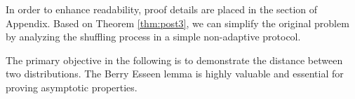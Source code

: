\documentclass[letterpaper]{article} %
\newtheorem{lemma}{Lemma}
\begin{document}
In order to enhance readability, proof details are placed in the section of Appendix. Based on Theorem \ref{thm:post3}, we can simplify the original problem by analyzing the shuffling process in a simple non-adaptive protocol.

The primary objective in the following is to demonstrate the distance between two distributions. The Berry Esseen lemma \cite{berry1941accuracy,Esseen1942} is highly valuable and essential for proving asymptotic properties.
%
%
%
%
\end{document}
